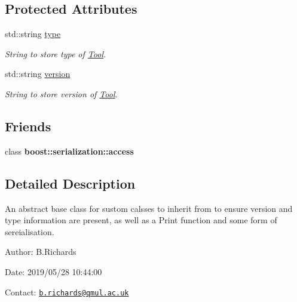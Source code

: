 \subsection*{Protected Attributes}
\begin{DoxyCompactItemize}
\item 
\hypertarget{classSerialisableObject_a893f965e41ad7f09b4066cb07fecef8e}{std\-::string \hyperlink{classSerialisableObject_a893f965e41ad7f09b4066cb07fecef8e}{type}}\label{classSerialisableObject_a893f965e41ad7f09b4066cb07fecef8e}

\begin{DoxyCompactList}\small\item\em String to store type of \hyperlink{classTool}{Tool}. \end{DoxyCompactList}\item 
\hypertarget{classSerialisableObject_ade0071c238a09193b37a2750d2b50b18}{std\-::string \hyperlink{classSerialisableObject_ade0071c238a09193b37a2750d2b50b18}{version}}\label{classSerialisableObject_ade0071c238a09193b37a2750d2b50b18}

\begin{DoxyCompactList}\small\item\em String to store version of \hyperlink{classTool}{Tool}. \end{DoxyCompactList}\end{DoxyCompactItemize}
\subsection*{Friends}
\begin{DoxyCompactItemize}
\item 
\hypertarget{classSerialisableObject_ac98d07dd8f7b70e16ccb9a01abf56b9c}{class {\bfseries boost\-::serialization\-::access}}\label{classSerialisableObject_ac98d07dd8f7b70e16ccb9a01abf56b9c}

\end{DoxyCompactItemize}


\subsection{Detailed Description}
An abstract base class for sustom calsses to inherit from to ensure version and type information are present, as well as a Print function and some form of sereialisation.

\begin{DoxyParagraph}{Author\-:}
B.\-Richards 
\end{DoxyParagraph}
\begin{DoxyParagraph}{Date\-:}
2019/05/28 10\-:44\-:00 
\end{DoxyParagraph}
Contact\-: \href{mailto:b.richards@qmul.ac.uk}{\tt b.\-richards@qmul.\-ac.\-uk} 

